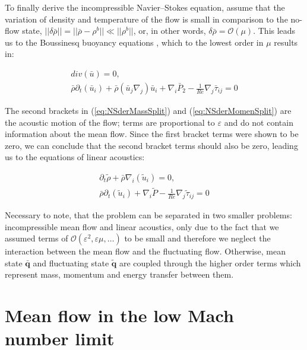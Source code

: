 To finally derive the incompressible Navier--Stokes equation, assume that the variation of density and temperature of the flow is small in comparison to the no-flow state, $||\delta \bar{\rho}|| = ||\bar{\rho} - \rho^b|| \ll || \rho^b ||$, or, in other words, $\delta \bar{\rho} = \mathcal{O}(\mu)$. This leads us to the Boussinesq buoyancy equations \cite{Rehm}, which to the lowest order in $\mu$ results in:

\begin{subequations}
\begin{align}
        div(\bar{u}) = 0, \\
        \bar{\rho} \partial_t  (\bar{u}_i) + \bar{\rho} (\bar{u}_j \nabla_j)\bar{u}_i + \nabla_i \bar{P}_2 - \frac{1}{Re} \nabla_j \bar{\tau}_{ij} = 0
\end{align}
\end{subequations}

The second brackets in (\ref{eq:NSderMassSplit}) and (\ref{eq:NSderMomenSplit}) are the acoustic motion of the flow; terms are proportional to $\varepsilon$ and do not contain information about the mean flow. Since the first bracket terms were shown to be zero, we can conclude that the second bracket terms should also be zero, leading us to the equations of linear acoustics:

\begin{subequations}
\label{eq:acousticT}
\begin{align}
        \partial_t  \tilde{\rho} + \bar{\rho}  \nabla_i (\tilde{u}_i) = 0, \\
        \bar{\rho} \partial_t (\tilde{u}_i) + \nabla_i \tilde{P} - \frac{1}{Re} \nabla_j \tilde{\tau}_{ij} = 0
\end{align}
\end{subequations}

Necessary to note, that the problem can be separated in two smaller problems: incompressible mean flow and linear acoustics, only due to the fact that we assumed terms of $\mathcal{O}(\varepsilon^2, \varepsilon \mu, \dots)$ to be small and therefore we neglect the interaction between the mean flow and the fluctuating flow. Otherwise, mean state $\bar{\mathbf{q}}$ and fluctuating state $\tilde{\mathbf{q}}$ are coupled through the higher order terms which represent mass, momentum and energy transfer between them.


\clearpage
\section{Mean flow in the low Mach number limit}

